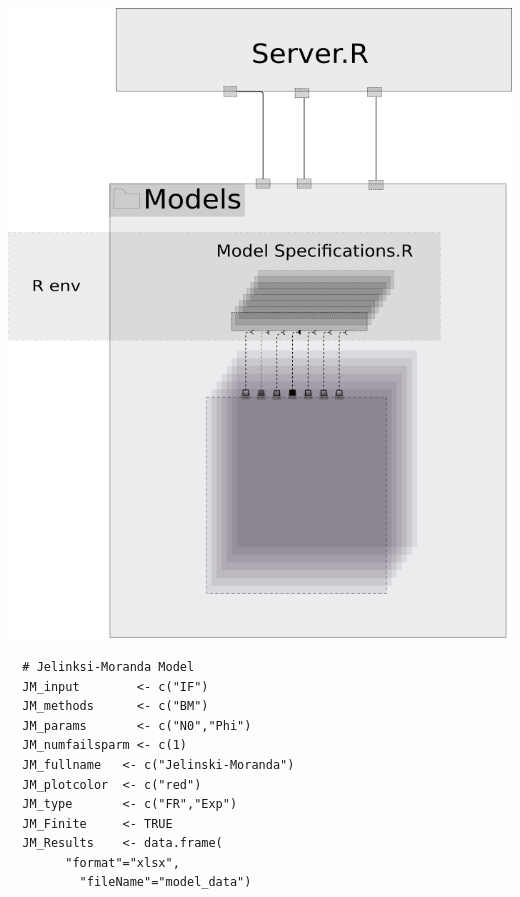 \documentclass[journal]{IEEEtran}
\begin{document}
\includegraphics[scale=0.35]{../ModelSpecifications.png}
\begin{verbatim}
  # Jelinksi-Moranda Model
  JM_input        <- c("IF")
  JM_methods      <- c("BM")
  JM_params       <- c("N0","Phi")
  JM_numfailsparm <- c(1)
  JM_fullname   <- c("Jelinski-Moranda")
  JM_plotcolor  <- c("red")
  JM_type       <- c("FR","Exp")
  JM_Finite     <- TRUE
  JM_Results    <- data.frame(
  		"format"="xlsx",
		  "fileName"="model_data")
\end{verbatim}
\end{document}
